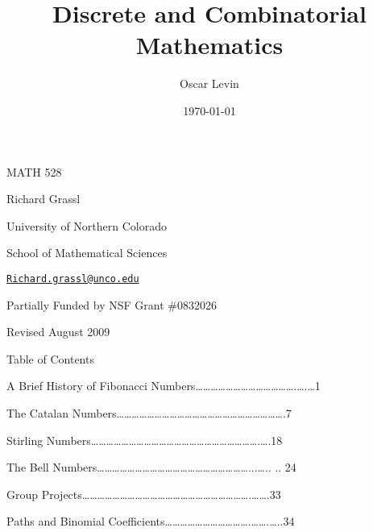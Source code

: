\documentclass[10pt,letter]{article}
\begin{document}
\title{Discrete and Combinatorial Mathematics}



\author[1]{Oscar Levin}%
%


\vspace{-1em}



  \date{\today}

\begingroup
\let\center\flushleft
\let\endcenter\endflushleft
\maketitle
\endgroup








MATH 528

Richard Grassl

University of Northern Colorado

School of Mathematical Sciences

\href{mailto:Richard.grassl@unco.edu}{\nolinkurl{Richard.grassl@unco.edu}}

Partially Funded by NSF Grant \#0832026

Revised August 2009

Table of Contents

A Brief History of Fibonacci
Numbers\ldots{}\ldots{}\ldots{}\ldots{}\ldots{}\ldots{}\ldots{}\ldots{}\ldots{}\ldots{}\ldots{}\ldots{}\ldots{}.\ldots{}.\ldots{}1

The Catalan
Numbers\ldots{}\ldots{}\ldots{}\ldots{}\ldots{}\ldots{}\ldots{}\ldots{}\ldots{}\ldots{}\ldots{}\ldots{}\ldots{}\ldots{}\ldots{}\ldots{}\ldots{}\ldots{}\ldots{}\ldots{}\ldots{}\ldots{}.7

Stirling
Numbers\ldots{}\ldots{}\ldots{}\ldots{}\ldots{}\ldots{}\ldots{}\ldots{}\ldots{}\ldots{}\ldots{}\ldots{}\ldots{}\ldots{}\ldots{}\ldots{}\ldots{}\ldots{}\ldots{}\ldots{}\ldots{}\ldots{}.\ldots{}.18

The Bell
Numbers\ldots{}\ldots{}\ldots{}\ldots{}\ldots{}\ldots{}\ldots{}\ldots{}\ldots{}\ldots{}\ldots{}\ldots{}\ldots{}\ldots{}\ldots{}\ldots{}\ldots{}\ldots{}\ldots{}\ldots{}...\ldots{}..
.. 24

Group
Projects\ldots{}\ldots{}\ldots{}\ldots{}\ldots{}\ldots{}\ldots{}\ldots{}\ldots{}\ldots{}\ldots{}\ldots{}\ldots{}\ldots{}\ldots{}\ldots{}\ldots{}\ldots{}\ldots{}\ldots{}\ldots{}\ldots{}.\ldots{}\ldots{}.33

Paths and Binomial
Coefficients\ldots{}\ldots{}\ldots{}\ldots{}\ldots{}\ldots{}\ldots{}\ldots{}\ldots{}\ldots{}\ldots{}.\ldots{}\ldots{}.\ldots{}..34
\end{document}
